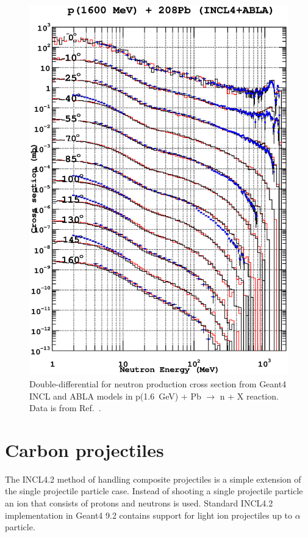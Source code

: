 \documentclass[a4paper]{jpconf}
\begin{document}
\begin{figure}
\begin{center}
\includegraphics[scale=0.70]{images/proton1600MeVPb.eps}
\caption{\label{fig:neutronFe}Double-differential for neutron production cross section
    from Geant4 INCL and ABLA models in p(1.6~GeV) + Pb $\rightarrow$ n + X reaction.
Data is from Ref.~\cite{data}.}

\end{center}

\end{figure}

\section{Carbon projectiles}\label{sec:carbon}
The INCL4.2 method of handling composite projectiles is a simple extension 
of the single projectile particle case. 
Instead of shooting a single projectile particle an ion that consists of protons and neutrons is used.
Standard INCL4.2 implementation in Geant4 9.2 contains support for light ion projectiles 
up to $\alpha$ particle.
\end{document}
